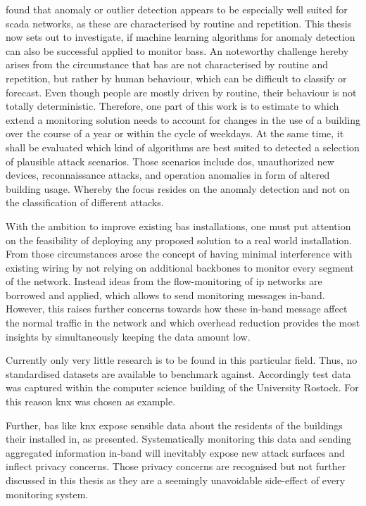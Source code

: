 \textcite{Yang2006} found that anomaly or outlier detection appears to be especially well suited for \gls{scada} networks, as these are characterised by routine and repetition.
This thesis now sets out to investigate, if machine learning algorithms for anomaly detection can also be successful applied to monitor \glspl{bas}. An noteworthy challenge hereby arises from the circumstance that \gls{bas} are not characterised by routine and repetition, but rather by human behaviour, which can be difficult to classify or forecast. Even though people are mostly driven by routine, their behaviour is not totally deterministic.
Therefore, one part of this work is to estimate to which extend a monitoring solution needs to account for changes in the use of a building over the course of a year or within the cycle of weekdays.
At the same time, it shall be evaluated which kind of algorithms are best suited to detected a selection of plausible attack scenarios.
Those scenarios include \gls{dos}, unauthorized new devices, reconnaissance attacks, and operation anomalies in form of altered building usage.
Whereby the focus resides on the anomaly detection and not on the classification of different attacks.

With the ambition to improve existing \gls{bas} installations, one must put attention on the feasibility of deploying any proposed solution to a real world installation. From those circumstances arose the concept of having minimal interference with existing wiring by not relying on additional backbones to monitor every segment of the network. Instead ideas from the flow-monitoring of \gls{ip} networks are borrowed and applied, which allows to send monitoring messages in-band.
However, this raises further concerns towards how these in-band message affect the normal traffic in the network and which overhead reduction provides the most insights by simultaneously keeping the data amount low.

Currently only very little research is to be found in this particular field. 
Thus, no standardised datasets are available to benchmark against. Accordingly test data was captured within the computer science building of the University Rostock. For this reason \gls{knx} was chosen as example.

Further, \gls{bas} like \gls{knx} expose sensible data about the residents of the buildings their installed in, as \textcite{Mundt2012} presented.
Systematically monitoring this data and sending aggregated information in-band will inevitably expose new attack surfaces and inflect privacy concerns.
Those privacy concerns are recognised but not further discussed in this thesis as they are a seemingly unavoidable side-effect of every monitoring system.

